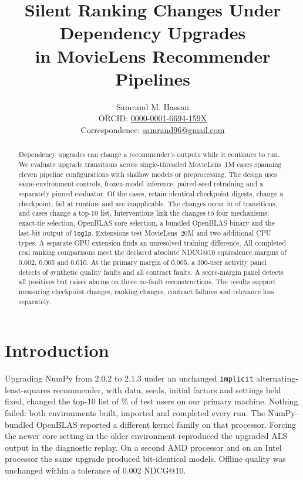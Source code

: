 \documentclass[11pt,a4paper]{article}
\title{Silent Ranking Changes Under Dependency Upgrades\\
  in MovieLens Recommender Pipelines}
\author{Samrand M. Hassan\\[0.5ex]
  \small ORCID: \href{https://orcid.org/0000-0001-6694-159X}{0000-0001-6694-159X}\\
  \small Correspondence: \href{mailto:samrand96@gmail.com}{samrand96@gmail.com}}
\date{}
\begin{document}
\maketitle

\begin{abstract}
Dependency upgrades can change a recommender's outputs while it continues to
run. We evaluate \nTransitions{} upgrade transitions across \nCases{}
single-threaded MovieLens~1M cases spanning eleven pipeline configurations
with shallow models or preprocessing. The design uses same-environment
controls, frozen-model inference, paired-seed retraining and a separately
pinned evaluator. Of the \nCases{} cases, \nIdentical{} retain identical
checkpoint digests, \nChanged{} change a checkpoint, \nFailure{} fail at
runtime and \nNotApplicable{} are inapplicable. The changes occur in
\nTransitionsChanged{} of \nTransitions{} transitions, and \nListChanged{}
cases change a top-10 list. Interventions link the changes to four mechanisms:
exact-tie selection, OpenBLAS core selection, a bundled OpenBLAS binary and
the last-bit output of \texttt{log1p}. Extensions test MovieLens~20M and two
additional CPU types. A separate GPU extension finds an unresolved training
difference. All completed real ranking comparisons meet the declared absolute
NDCG@10 equivalence margins of 0.002, 0.005 and 0.010. At the primary margin
of 0.005, a 300-user activity panel detects \synPrimaryFOne{} of \synFOne{}
synthetic quality faults and all \synContractPositives{} contract faults.
A score-margin panel detects all positives but raises alarms on three
no-fault reconstructions. The results support measuring checkpoint changes,
ranking changes, contract failures and relevance loss separately.
\end{abstract}

\section{Introduction}
\label{sec:introduction}

Upgrading NumPy from 2.0.2 to 2.1.3 under an unchanged \texttt{implicit}
alternating-least-squares recommender, with data, seeds, initial factors and
settings held fixed, changed the top-10 list of \fracMTwo\% of test users on
our primary machine. Nothing failed: both environments built, imported and
completed every run. The NumPy-bundled OpenBLAS reported a different
kernel family on that processor. Forcing the newer core setting in the
older environment reproduced the upgraded ALS output in the diagnostic
replay. On a second AMD processor
and on an Intel processor the same upgrade produced bit-identical models.
Offline quality was unchanged within a tolerance of 0.002 NDCG@10.
\end{document}
